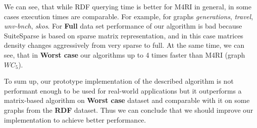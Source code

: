 We can see, that while RDF querying time is better for M4RI in general, in some cases execution times are comparable. For example, for graphs \textit{generations}, \textit{travel},  \textit{unv-bnch}, \textit{skos}.
For \textbf{Full} data set performance of our algorithm is bad because SuiteSparse is based on sparse matrix representation, and in this case matrices density changes aggressively from very sparse to full.
At the same time, we can see, that in \textbf{Worst case} our algorithms up to 4 times faster than M4RI (graph $WC_5$).

To sum up, our prototype implementation of the described algorithm is not performant enough to be used for real-world applications but it outperforms a matrix-based algorithm on \textbf{Worst case} dataset and comparable with it on some graphs from the \textbf{RDF} dataset. Thus we can conclude that we should improve our implementation to achieve better performance.

